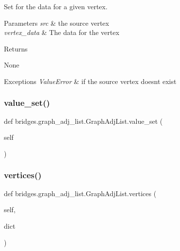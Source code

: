 Set for the data for a given vertex. 


\begin{DoxyParams}{Parameters}
{\em src} & the source vertex \\
\hline
{\em vertex\+\_\+data} & The data for the vertex \\
\hline
\end{DoxyParams}
\begin{DoxyReturn}{Returns}


None
\end{DoxyReturn}

\begin{DoxyExceptions}{Exceptions}
{\em Value\+Error} & if the source vertex doesnt exist \\
\hline
\end{DoxyExceptions}
\mbox{\label{classbridges_1_1graph__adj__list_1_1_graph_adj_list_ae12db7b48cf37ba8d2852fa05ebaa2c0}} 
\subsubsection{\texorpdfstring{value\+\_\+set()}{value\_set()}}
{\footnotesize\ttfamily def bridges.\+graph\+\_\+adj\+\_\+list.\+Graph\+Adj\+List.\+value\+\_\+set (\begin{DoxyParamCaption}\item[{}]{self }\end{DoxyParamCaption})}

\mbox{\label{classbridges_1_1graph__adj__list_1_1_graph_adj_list_ae41cb9193582a782d4880b18085fc1c6}} 
\subsubsection{\texorpdfstring{vertices()}{vertices()}}
{\footnotesize\ttfamily def bridges.\+graph\+\_\+adj\+\_\+list.\+Graph\+Adj\+List.\+vertices (\begin{DoxyParamCaption}\item[{}]{self,  }\item[{}]{dict }\end{DoxyParamCaption})}



